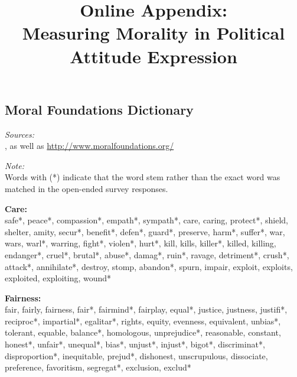 \documentclass[12pt]{article}
\title{{\large Online Appendix:}\\Measuring Morality in Political Attitude Expression}
\date{}
\begin{document}
\footnotesize\singlespacing
\renewcommand\thesubsection{\Roman{subsection}}

\maketitle
\appendices

\thispagestyle{empty}
\startcontents[sections]
\clearpage \setcounter{page}{1}

\begin{flushleft}
\section{Moral Foundations Dictionary}\label{app:dict}
\textit{Sources:}\\
\citet{graham2009liberals}, as well as \url{http://www.moralfoundations.org/}
\vspace{.5cm}

\textit{Note:}\\
Words with (*) indicate that the word stem rather than the exact word was matched in the open-ended survey responses.
\vspace{.5cm}

\textbf{Care:}\\
safe*, peace*, compassion*, empath*, sympath*, care, caring, protect*, shield, shelter, amity, secur*, benefit*, defen*, guard*, preserve, harm*, suffer*, war, wars, warl*, warring, fight*, violen*, hurt*, kill, kills, killer*, killed, killing, endanger*, cruel*, brutal*, abuse*, damag*, ruin*, ravage, detriment*, crush*, attack*, annihilate*, destroy, stomp, abandon*, spurn, impair, exploit, exploits, exploited, exploiting, wound*
\vspace{.5cm}

\textbf{Fairness:}\\
fair, fairly, fairness, fair*, fairmind*, fairplay, equal*, justice, justness, justifi*, reciproc*, impartial*, egalitar*, rights, equity, evenness, equivalent, unbias*, tolerant, equable, balance*, homologous, unprejudice*, reasonable, constant, honest*, unfair*, unequal*, bias*, unjust*, injust*, bigot*, discriminat*, disproportion*, inequitable, prejud*, dishonest, unscrupulous, dissociate, preference, favoritism, segregat*, exclusion, exclud*
\vspace{.5cm}


\end{flushleft}
\end{document}
